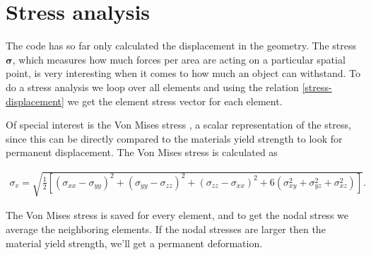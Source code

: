 \section{Stress analysis}

The code has so far only calculated the displacement in the geometry. The stress $\bm{\sigma}$, which measures how much forces per area are acting on a particular spatial point, is very interesting when it comes to how much an object can withstand. To do a stress analysis we loop over all elements and using the relation \eqref{stress-displacement} we get the element stress vector for each element.

Of special interest is the Von Mises stress \cite{VonMises}, a scalar representation of the stress, since this can be directly compared to the materials yield strength to look for permanent displacement. The Von Mises stress is calculated as 

\begin{align*}
\sigma_{v} = \sqrt{ \frac{1}{2} \left[  (\sigma_{xx} -\sigma_{yy})^2 + (\sigma_{yy} -\sigma_{zz})^2 + (\sigma_{zz} -\sigma_{xx})^2 + 6\left(\sigma_{xy}^2 + \sigma_{yz}^2 + \sigma_{xz}^2 \right) \right]}.
\end{align*}


The Von Mises stress is saved for every element, and to get the nodal stress we average the neighboring elements. If the nodal stresses are larger then the material yield strength, we'll get a permanent deformation.